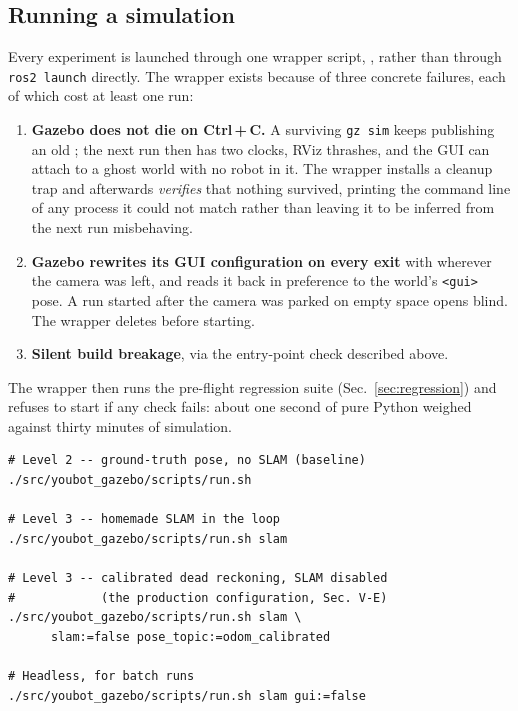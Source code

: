 \subsection{Running a simulation}

Every experiment is launched through one wrapper script,
, rather than through
\texttt{ros2 launch} directly. The wrapper exists because of three
concrete failures, each of which cost at least one run:

\begin{enumerate}[leftmargin=*,itemsep=1pt,topsep=2pt]
  \item \textbf{Gazebo does not die on Ctrl\,+\,C.} A surviving
        \texttt{gz sim} keeps publishing an old ; the
        next run then has two clocks, RViz thrashes, and the GUI can
        attach to a ghost world with no robot in it. The wrapper
        installs a cleanup trap and afterwards \emph{verifies} that
        nothing survived, printing the command line of any process it
        could not match rather than leaving it to be inferred from the
        next run misbehaving.
  \item \textbf{Gazebo rewrites its GUI configuration on every exit}
        with wherever the camera was left, and reads it back in
        preference to the world's \texttt{<gui>} pose. A run started
        after the camera was parked on empty space opens blind. The
        wrapper deletes 
        before starting.
  \item \textbf{Silent build breakage}, via the entry-point check
        described above.
\end{enumerate}

The wrapper then runs the pre-flight regression suite
(Sec.~\ref{sec:regression}) and refuses to start if any check fails:
about one second of pure Python weighed against thirty minutes of
simulation.

\begin{lstlisting}[style=bash,caption={The supported launch
configurations.},label={lst:run}]
# Level 2 -- ground-truth pose, no SLAM (baseline)
./src/youbot_gazebo/scripts/run.sh

# Level 3 -- homemade SLAM in the loop
./src/youbot_gazebo/scripts/run.sh slam

# Level 3 -- calibrated dead reckoning, SLAM disabled
#            (the production configuration, Sec. V-E)
./src/youbot_gazebo/scripts/run.sh slam \
      slam:=false pose_topic:=odom_calibrated

# Headless, for batch runs
./src/youbot_gazebo/scripts/run.sh slam gui:=false
\end{lstlisting}

